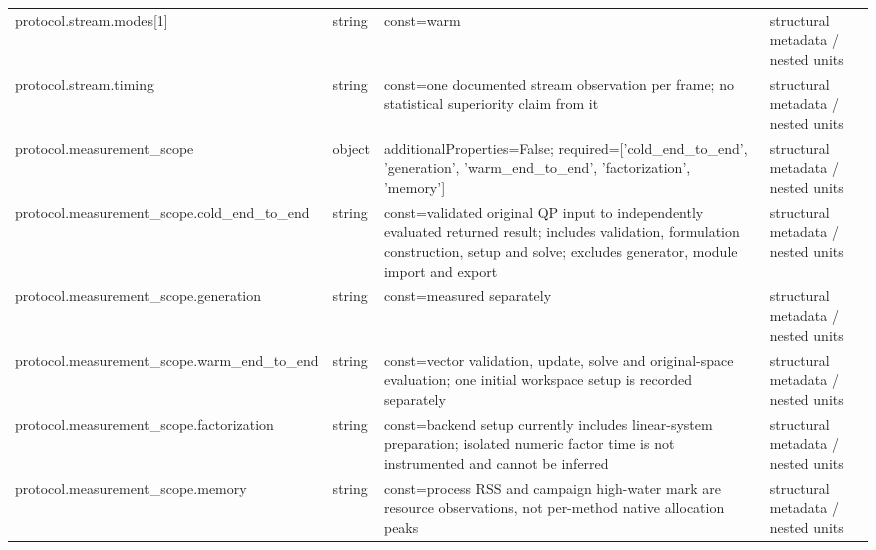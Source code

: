 \begin{longtable}{@{}>{\raggedright\arraybackslash}p{}>{\raggedright\arraybackslash}p{}>{\raggedright\arraybackslash}p{}>{\raggedright\arraybackslash}p{}@{}}
protocol.\allowbreak{}stream.\allowbreak{}modes[1] & string & const=\allowbreak{}warm & structural metadata /\allowbreak{} nested units\\
protocol.\allowbreak{}stream.\allowbreak{}timing & string & const=\allowbreak{}one documented stream observation per frame; no statistical superiority claim from it & structural metadata /\allowbreak{} nested units\\
protocol.\allowbreak{}measurement\_\allowbreak{}scope & object & additionalProperties=\allowbreak{}False; required=\allowbreak{}['cold\_\allowbreak{}end\_\allowbreak{}to\_\allowbreak{}end', 'generation', 'warm\_\allowbreak{}end\_\allowbreak{}to\_\allowbreak{}end', 'factorization', 'memory'] & structural metadata /\allowbreak{} nested units\\
protocol.\allowbreak{}measurement\_\allowbreak{}scope.\allowbreak{}cold\_\allowbreak{}end\_\allowbreak{}to\_\allowbreak{}end & string & const=\allowbreak{}validated original QP input to independently evaluated returned result; includes validation, formulation construction, setup and solve; excludes generator, module import and export & structural metadata /\allowbreak{} nested units\\
protocol.\allowbreak{}measurement\_\allowbreak{}scope.\allowbreak{}generation & string & const=\allowbreak{}measured separately & structural metadata /\allowbreak{} nested units\\
protocol.\allowbreak{}measurement\_\allowbreak{}scope.\allowbreak{}warm\_\allowbreak{}end\_\allowbreak{}to\_\allowbreak{}end & string & const=\allowbreak{}vector validation, update, solve and original-\allowbreak{}space evaluation; one initial workspace setup is recorded separately & structural metadata /\allowbreak{} nested units\\
protocol.\allowbreak{}measurement\_\allowbreak{}scope.\allowbreak{}factorization & string & const=\allowbreak{}backend setup currently includes linear-\allowbreak{}system preparation; isolated numeric factor time is not instrumented and cannot be inferred & structural metadata /\allowbreak{} nested units\\
protocol.\allowbreak{}measurement\_\allowbreak{}scope.\allowbreak{}memory & string & const=\allowbreak{}process RSS and campaign high-\allowbreak{}water mark are resource observations, not per-\allowbreak{}method native allocation peaks & structural metadata /\allowbreak{} nested units\\ %

\end{longtable}
